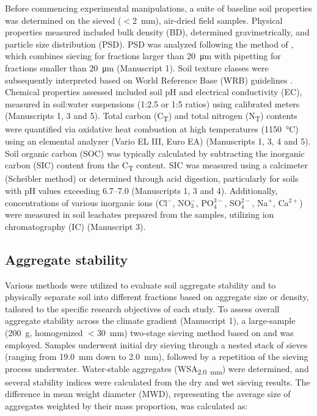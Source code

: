 Before commencing experimental manipulations, a suite of baseline soil properties was determined on the sieved ($<$\SI{2}{\milli\metre}), air-dried field samples. Physical properties measured included bulk density (BD), determined gravimetrically, and particle size distribution (PSD). PSD was analyzed following the method of \citet{Kohn1929}, which combines sieving for fractions larger than \SI{20}{\micro\metre} with pipetting for fractions smaller than \SI{20}{\micro\metre} (Manuscript 1). Soil texture classes were subsequently interpreted based on World Reference Base (WRB) guidelines \citep{Jahn2006}. Chemical properties assessed included soil pH and electrical conductivity (EC), measured in soil:water suspensions (1:2.5 or 1:5 ratios) using calibrated meters (Manuscripts 1, 3 and 5). Total carbon (C\textsubscript{T}) and total nitrogen (N\textsubscript{T}) contents were quantified via oxidative heat combustion at high temperatures (\SI{1150}{\degreeCelsius}) using an elemental analyzer (Vario EL III, Euro EA) (Manuscripts 1, 3, 4 and 5). Soil organic carbon (SOC) was typically calculated by subtracting the inorganic carbon (SIC) content from the C\textsubscript{T} content. SIC was measured using a calcimeter (Scheibler method) or determined through acid digestion, particularly for soils with pH values exceeding 6.7--7.0 (Manuscripts 1, 3 and 4). Additionally, concentrations of various inorganic ions (Cl$^{-}$, NO$_{3}^{-}$, PO$_{4}^{3-}$, SO$_{4}^{2-}$, Na$^{+}$, Ca$^{2+}$) were measured in soil leachates prepared from the samples, utilizing ion chromatography (IC) (Manuscript 3).

\subsection{Aggregate stability}

Various methods were utilized to evaluate soil aggregate stability and to physically separate soil into different fractions based on aggregate size or density, tailored to the specific research objectives of each study. To assess overall aggregate stability across the climate gradient (Manuscript 1), a large-sample (\SI{200}{\gram}, homogenized $<$\SI{30}{\milli\meter}) two-stage sieving method based on \citet{Hartge2009} and \citet{Six2000} was employed. Samples underwent initial dry sieving through a nested stack of sieves (ranging from \SI{19.0}{\milli\meter} down to \SI{2.0}{\milli\meter}), followed by a repetition of the sieving process underwater. Water-stable aggregates (WSA\textsubscript{\SI{2.0}{\milli\meter}}) were determined, and several stability indices were calculated from the dry and wet sieving results. The difference in mean weight diameter (MWD), representing the average size of aggregates weighted by their mass proportion, was calculated as:

